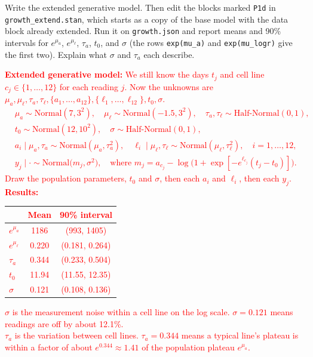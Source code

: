\documentclass[11pt]{article}
\begin{document}
Write the extended generative model. Then edit the blocks marked {\tt P1d} in
{\tt growth\_extend.stan}, which starts as a copy of the base model with the data block already
extended. Run it on {\tt growth.json} and report means and 90\% intervals for $e^{\mu_a}$,
$e^{\mu_\ell}$, $\tau_a$, $t_0$, and $\sigma$ (the rows {\tt exp(mu\_a)} and {\tt exp(mu\_logr)} give
the first two). Explain what $\sigma$ and $\tau_a$ each
describe.

\textcolor{red}{
\textbf{Extended generative model:} We still know the days $t_j$ and cell line $c_j \in \{1,\dots,12\}$ for each
reading $j$. Now the unknowns are $\mu_a, \mu_\ell, \tau_a, \tau_\ell, \{a_1,\dots,a_{12}\}, \{\ell_1,\dots,\ell_{12}\}, t_0, \sigma$.\\
\begin{align*}
&\mu_a \sim \text{Normal}(7, 3^2), \quad \mu_\ell \sim \text{Normal}(-1.5, 3^2), \quad \tau_a, \tau_\ell \sim \text{Half-Normal}(0, 1), \\
&t_0 \sim \text{Normal}(12, 10^2), \quad \sigma \sim \text{Half-Normal}(0, 1), \\
&a_i \mid \mu_a, \tau_a \sim \text{Normal}(\mu_a, \tau_a^2), \quad \ell_i \mid \mu_\ell, \tau_\ell \sim \text{Normal}(\mu_\ell, \tau_\ell^2), \quad i = 1,\dots,12, \\
&y_j \mid \cdot \sim \text{Normal}\big(m_j, \sigma^2\big), \quad \text{where } m_j = a_{c_j} - \log\big(1 + \exp[-e^{\ell_{c_j}}(t_j - t_0)]\big).
\end{align*}
Draw the population parameters, $t_0$ and $\sigma$, then each $a_i$ and $\ell_i$, then each $y_j$.\\
\textbf{Results:}
\begin{center}
\begin{tabular}{lcc}
 & Mean & 90\% interval \\ \hline
$e^{\mu_a}$ & 1186 & (993, 1405) \\
$e^{\mu_\ell}$ & 0.220 & (0.181, 0.264) \\
$\tau_a$ & 0.344 & (0.233, 0.504) \\
$t_0$ & 11.94 & (11.55, 12.35) \\
$\sigma$ & 0.121 & (0.108, 0.136)
\end{tabular}
\end{center}
$\sigma$ is the measurement noise within a cell line on the log scale. $\sigma = 0.121$ means readings are off by about 12.1\%.\\
$\tau_a$ is the variation between cell lines. $\tau_a = 0.344$ means a typical line's plateau is within a factor of about $e^{0.344} \approx 1.41$ of the population plateau $e^{\mu_a}$.
}
\end{document}

